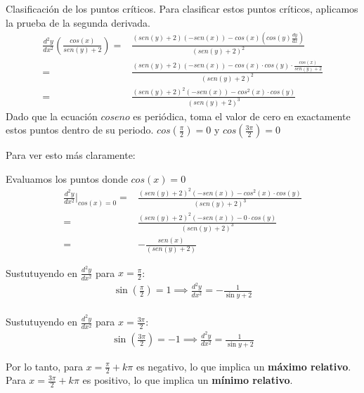 \noindent
Clasificación de los puntos críticos. Para clasificar estos puntos críticos, aplicamos la prueba de la segunda derivada.
\begin{align*}
	\frac{d^2y}{dx^2}\left(\frac{cos (x)}{sen(y)+2}\right)= & \frac{(sen(y)+2)\left(-sen(x)\right)-cos(x)\left(cos(y)\frac{dy}{dx}\right)}{\left(sen(y)+2\right)^2}         \\
	=                                                       & \frac{(sen(y)+2)\left(-sen(x)\right)-cos(x)\cdot cos(y)\cdot\frac{cos(x)}{sen(y)+2}}{\left(sen(y)+2\right)^2} \\
	=                                                       & \frac{(sen(y)+2)^2\left(-sen(x)\right)-cos^2(x)\cdot cos(y)}{\left(sen(y)+2\right)^3}
\end{align*}
Dado que la ecuación $coseno$ es periódica, toma el valor de cero en exactamente estos puntos dentro de su periodo.
$cos\left(\frac{\pi}{2}\right)=0$ y $cos\left(\frac{3\pi}{2}\right)=0$

Para ver esto más claramente:

Evaluamos los puntos donde $cos(x)=0$
\begin{align*}
	\frac{d^2y}{dx^2}\bigg|_{cos (x)=0}= & \frac{(sen(y)+2)^2\left(-sen(x)\right)-cos^2(x)\cdot cos(y)}{\left(sen(y)+2\right)^3} \\
	=                                          & \frac{(sen(y)+2)^2\left(-sen(x)\right)-0\cdot cos(y)}{\left(sen(y)+2\right)^3}                                     \\
	=                                          & -\frac{sen(x)}{\left(sen(y)+2\right)}                                          
\end{align*}
\vspace{-20px}
\begin{multicols}{2}
    Sustutuyendo en $\frac{d^2y}{dx^2}$ para $x=\frac{\pi}{2}$:
    \noindent
    \begin{align*}
        \sin\left(\frac{\pi}{2}\right) = 1 \implies \frac{d^2y}{dx^2} = -\frac{1}{\sin y + 2}
    \end{align*}
    \columnbreak\\
    Sustutuyendo en $\frac{d^2y}{dx^2}$ para $x=\frac{3\pi}{2}$:
    \begin{align*}
        \sin\left(\frac{3\pi}{2}\right) = -1 \implies \frac{d^2y}{dx^2} = \frac{1}{\sin y + 2}
    \end{align*}
\end{multicols}
\noindent
Por lo tanto, para $x = \frac{\pi}{2}+k\pi$ es negativo, lo que implica un \textbf{máximo relativo}.\\
Para $x = \frac{3\pi}{2}+k\pi$ es positivo, lo que implica un \textbf{mínimo relativo}.
